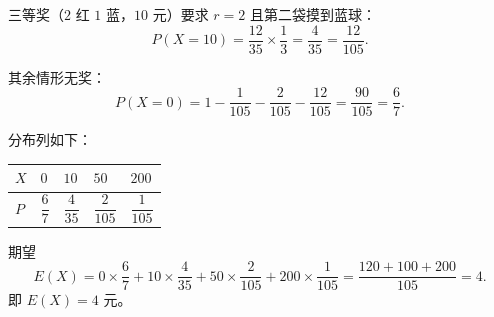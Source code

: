 \begin{answer}
三等奖（$2$ 红 $1$ 蓝，$10$ 元）要求 $r=2$ 且第二袋摸到蓝球：
\nopagebreak[4]
\[P(X=10)=\frac{12}{35}\times\frac13=\frac4{35}=\frac{12}{105}.\]

其余情形无奖：
\nopagebreak[4]
\[P(X=0)=1-\frac1{105}-\frac2{105}-\frac{12}{105}=\frac{90}{105}=\frac67.\]

分布列如下：

\begin{center}
\begin{tabular}{lllll}
\toprule
$X$ & $0$ & $10$ & $50$ & $200$ \\
\midrule
$P$ & $\dfrac67$ & $\dfrac4{35}$ & $\dfrac2{105}$ & $\dfrac1{105}$ \\
\bottomrule
\end{tabular}
\end{center}

期望
\nopagebreak[4]
\[E(X)=0\times\frac67+10\times\frac4{35}+50\times\frac2{105}+200\times\frac1{105}
=\frac{120+100+200}{105}=4.\]
即 $E(X)=4$ 元。



\end{answer}
